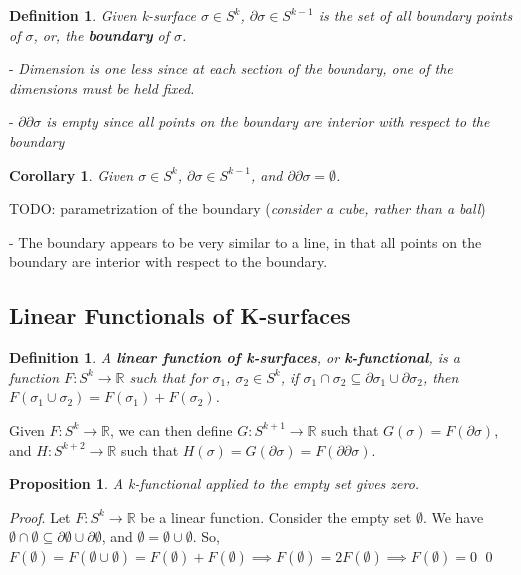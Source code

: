 \documentclass{book}
\newtheorem{defn}[equation]{Definition}
\newtheorem{coro}[equation]{Corollary}
\newtheorem{prop}[equation]{Proposition}
\renewenvironment{proof}{\emph{Proof}.}{\qed}
\begin{document}
\begin{defn}
	Given k-surface $\sigma \in S^k$, $\partial\sigma \in S^{k-1}$ is the set of all boundary points of $\sigma$, or, the \textbf{boundary} of $\sigma$. 
\end{defn}

- \emph{Dimension is one less since at each section of the boundary, one of the dimensions must be held fixed. }

- \emph{$\partial\partial\sigma$ is empty since all points on the boundary are interior with respect to the boundary}


\begin{coro}
	Given $\sigma \in S^k$, $\partial\sigma \in S^{k-1}$, and $\partial\partial\sigma = \emptyset$. 
\end{coro}

TODO: parametrization of the boundary (\emph{consider a cube, rather than a ball})

- The boundary appears to be very similar to a line, in that all points on the boundary are interior with respect to the boundary. 

\subsection{Linear Functionals of K-surfaces}


\begin{defn}
	A \textbf{linear function of k-surfaces}, or \textbf{k-functional}, is a function $F : S^k \to \mathbb{R}$ such that for $\sigma_1$, $\sigma_2 \in S^k$, if $\sigma_1 \cap \sigma_2 \subseteq \partial\sigma_1 \cup \partial\sigma_2$, then $F(\sigma_1\cup\sigma_2) = F(\sigma_1) + F(\sigma_2)$. 
\end{defn}


Given $F : S^k \to \mathbb{R}$, we can then define $G : S^{k+1} \to \mathbb{R}$ such that $G(\sigma) = F(\partial\sigma)$, and $H : S^{k+2} \to \mathbb{R}$ such that $H(\sigma) = G(\partial\sigma) = F(\partial\partial\sigma)$. 

\begin{prop}
	A k-functional applied to the empty set gives zero. 
\end{prop}
\begin{proof}
	Let $F : S^k \to \mathbb{R}$ be a linear function. Consider the empty set $\emptyset$. 
We have $\emptyset \cap \emptyset \subseteq \partial\emptyset \cup \partial\emptyset$, and $\emptyset = \emptyset\cup\emptyset$. 
So, $F(\emptyset) = F(\emptyset\cup\emptyset) = F(\emptyset) + F(\emptyset) \implies F(\emptyset) = 2F(\emptyset) \implies F(\emptyset) = 0$
\end{proof}
\end{document}

